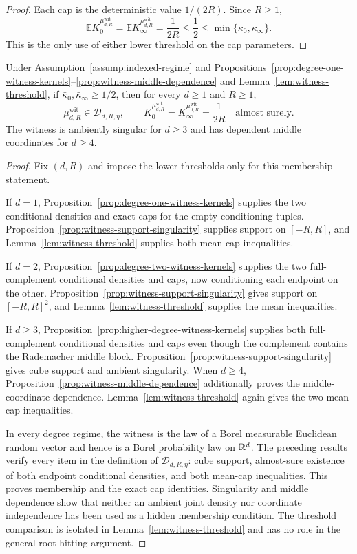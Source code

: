 \begin{proof}
Each cap is the deterministic value $1/(2R)$.  Since $R\geq1$,
\[
\mathbb E K_0^{\mu^{\mathrm{wit}}_{d,R}}
=\mathbb E K_\infty^{\mu^{\mathrm{wit}}_{d,R}}
=\frac1{2R}
\leq\frac12
\leq\min\{\bar\kappa_0,\bar\kappa_\infty\}.
\]
This is the only use of either lower threshold on the cap parameters.
\end{proof}

\begin{proposition}
\label{prop:witness-membership}
Under Assumption~\ref{assump:indexed-regime} and
Propositions~\ref{prop:degree-one-witness-kernels}--\ref{prop:witness-middle-dependence}
and Lemma~\ref{lem:witness-threshold}, if
$\bar\kappa_0,\bar\kappa_\infty\geq1/2$, then for every $d\geq1$ and
$R\geq1$,
\[
\mu^{\mathrm{wit}}_{d,R}\in\mathcal D_{d,R,\eta},
\qquad
K_0^{\mu^{\mathrm{wit}}_{d,R}}
=K_\infty^{\mu^{\mathrm{wit}}_{d,R}}
=\frac1{2R}\quad\text{almost surely}.
\]
The witness is ambiently singular for $d\geq3$ and has dependent middle
coordinates for $d\geq4$.
\end{proposition}

\begin{proof}
Fix $(d,R)$ and impose the lower thresholds only for this membership
statement.

If $d=1$, Proposition~\ref{prop:degree-one-witness-kernels} supplies the two
conditional densities and exact caps for the empty conditioning tuples.
Proposition~\ref{prop:witness-support-singularity} supplies support on
$[-R,R]$, and Lemma~\ref{lem:witness-threshold} supplies both mean-cap
inequalities.

If $d=2$, Proposition~\ref{prop:degree-two-witness-kernels} supplies the two
full-complement conditional densities and caps, now conditioning each
endpoint on the other.  Proposition~\ref{prop:witness-support-singularity}
gives support on $[-R,R]^2$, and Lemma~\ref{lem:witness-threshold} supplies
the mean inequalities.

If $d\geq3$, Proposition~\ref{prop:higher-degree-witness-kernels} supplies
both full-complement conditional densities and caps even though the
complement contains the Rademacher middle block.
Proposition~\ref{prop:witness-support-singularity} gives cube support and
ambient singularity.  When $d\geq4$,
Proposition~\ref{prop:witness-middle-dependence} additionally proves the
middle-coordinate dependence.  Lemma~\ref{lem:witness-threshold} again gives
the two mean-cap inequalities.

In every degree regime, the witness is the law of a Borel measurable
Euclidean random vector and hence is a Borel probability law on $\mathbb{R}^d$.  The
preceding results verify every item in the definition of
$\mathcal D_{d,R,\eta}$: cube support, almost-sure existence of both endpoint
conditional densities, and both mean-cap inequalities.  This proves
membership and the exact cap identities.  Singularity and middle dependence
show that neither an ambient joint density nor coordinate independence has
been used as a hidden membership condition.  The threshold comparison is
isolated in Lemma~\ref{lem:witness-threshold} and has no role in the general
root-hitting argument.
\end{proof}

